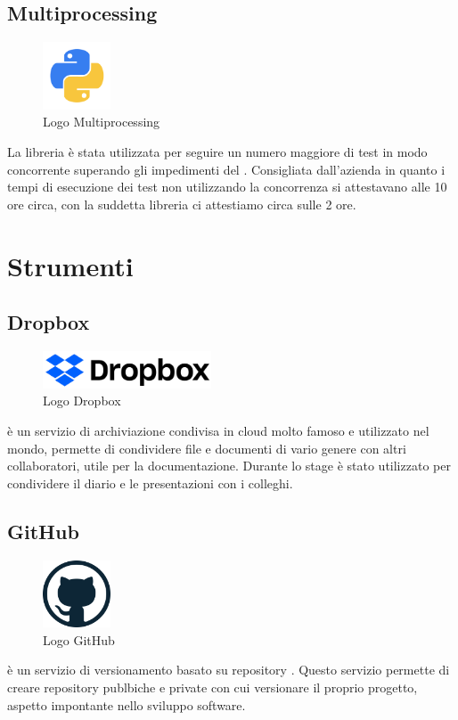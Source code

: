 \subsection{Multiprocessing}
\begin{figure}[H]
	\begin{center} \includegraphics[width=2cm]{figures/python}
		\caption[Logo Multiprocessing]{Logo Multiprocessing}  
	\end{center}
\end{figure}
La libreria  è stata utilizzata per seguire un numero maggiore di test in modo concorrente superando gli impedimenti del . Consigliata dall'azienda in quanto i tempi di esecuzione dei test non utilizzando la concorrenza si attestavano alle 10 ore circa, con la suddetta libreria ci attestiamo circa sulle 2 ore.

\section{Strumenti}
\subsection{Dropbox}
\begin{figure}[H]
	\begin{center} \includegraphics[width=5cm]{figures/dropbox_2017_logo}
		\caption[Logo Dropbox]{Logo Dropbox}  
	\end{center}
\end{figure}
 è un servizio di archiviazione condivisa in cloud molto famoso e utilizzato nel mondo, permette di condividere file e documenti di vario genere con altri collaboratori, utile per la documentazione. Durante lo stage è stato utilizzato per condividere il diario e le presentazioni con i colleghi.

\subsection{GitHub}
\begin{figure}[H]
	\begin{center} \includegraphics[width=2cm]{figures/github-logo}
		\caption[Logo GitHub]{Logo GitHub}  
	\end{center}
\end{figure}
 è un servizio di versionamento basato su repository . Questo servizio permette di creare repository publbiche e private con cui versionare il proprio progetto, aspetto impontante nello sviluppo software.

